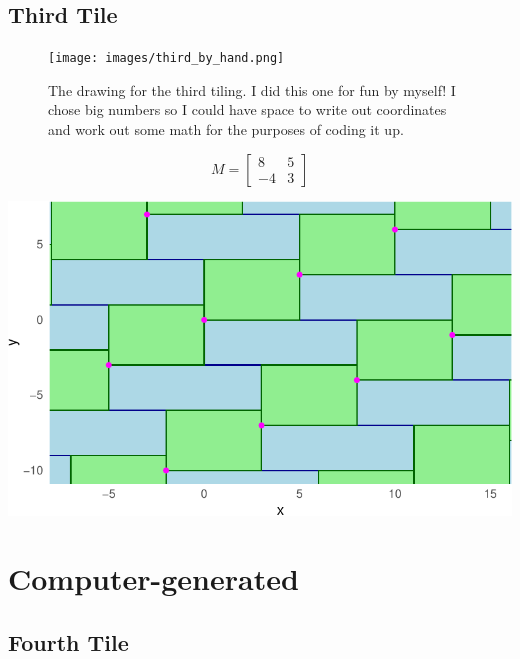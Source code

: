 \documentclass[
  letterpaper,
  DIV=11,
  numbers=noendperiod]{scrreprt}
\begin{document}
\hypertarget{third-tile}{%
\subsection*{Third Tile}\label{third-tile}}

\begin{figure}

{\centering \texttt{[image: images/third\_by\_hand.png]}

}

\caption{The drawing for the third tiling. I did this one for fun by
myself! I chose big numbers so I could have space to write out
coordinates and work out some math for the purposes of coding it up.}

\end{figure}

\[
M = \begin{bmatrix} 8& 5\\ -4 & 3\end{bmatrix}
\]

\includegraphics{handdrawn_files/figure-pdf/third-1.pdf}

\hypertarget{computer-generated}{%
\section*{Computer-generated}\label{computer-generated}}


\hypertarget{fourth-tile}{%
\subsection*{Fourth Tile}\label{fourth-tile}}
\end{document}
